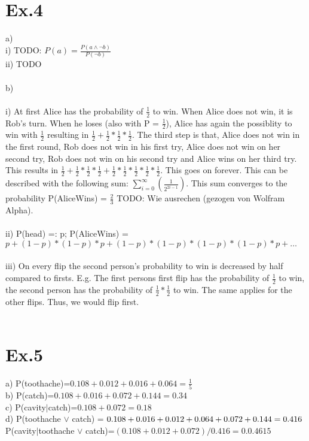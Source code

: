\documentclass[11pt]{article}
\begin{document}
\section*{Ex.4}

a)\\
i) TODO: $P(a) = \frac{P(a \wedge \neg b)}{P(\neg b)} $\\
ii) TODO\\
\\
b)\\
\\
i) At first Alice has the probability of $\frac{1}{2}$ to win. When Alice does not win, it is Rob's turn. When he loses (also with P = $\frac{1}{2}$), Alice has again the possiblity to win with $\frac{1}{2}$ resulting in $\frac{1}{2}+\frac{1}{2}*\frac{1}{2}*\frac{1}{2}$. The third step is that, Alice does not win in the first round, Rob does not win in his first try, Alice does not win on her second try, Rob does not win on his second try and Alice wins on her third try. This results in $\frac{1}{2}+\frac{1}{2}*\frac{1}{2}*\frac{1}{2}+\frac{1}{2}*\frac{1}{2}*\frac{1}{2}*\frac{1}{2}*\frac{1}{2}$. This goes on forever. This can be described with the following sum: $ \sum\nolimits_{i=0}^\infty(\frac{1}{2^{2i-1}})$. This sum converges to the probability P(AliceWins) = $\frac{2}{3}$ TODO: Wie ausrechen (gezogen von Wolfram Alpha).\\
\\
ii) P(head) =: p; P(AliceWins) = $p + (1-p) *(1-p) * p + (1-p) * (1-p) * (1-p) * (1-p) *p + \dots$ \\
\\
iii) On every flip the second person's probability to win is decreased by half compared to firsts. E.g. The first persons first flip has the probability of $\frac{1}{2}$ to win, the second person has the probability of $\frac{1}{2}*\frac{1}{2}$ to win. The same applies for the other flips. Thus, we would flip first.\\
\\
\section*{Ex.5}
a) P(toothache)=$0.108+0.012+0.016+0.064=\frac{1}{5}$\\
b) P(catch)=$0.108+0.016+0.072+0.144=0.34$\\
c) P(cavity$|$catch)=$0.108+0.072=0.18$\\
d) P(toothache $\vee$ catch) = $0.108+0.016+0.012+0.064+0.072+0.144=0.416\\
$P(cavity$|$toothache $\vee$ catch)=$(0.108+0.012+0.072)/0.416=0.0.4615$\\
\end{document}
